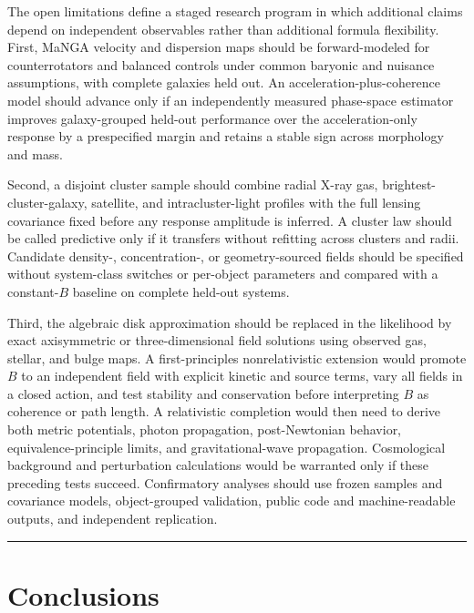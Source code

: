 \documentclass[aps,prd,reprint,superscriptaddress,showpacs,floatfix,longbibliography]{revtex4-2}
\begin{document}
The open limitations define a staged research program in which additional claims depend on independent observables rather than additional formula flexibility. First, MaNGA velocity and dispersion maps should be forward-modeled for counterrotators and balanced controls under common baryonic and nuisance assumptions, with complete galaxies held out. An acceleration-plus-coherence model should advance only if an independently measured phase-space estimator improves galaxy-grouped held-out performance over the acceleration-only response by a prespecified margin and retains a stable sign across morphology and mass.

Second, a disjoint cluster sample should combine radial X-ray gas, brightest-cluster-galaxy, satellite, and intracluster-light profiles with the full lensing covariance fixed before any response amplitude is inferred. A cluster law should be called predictive only if it transfers without refitting across clusters and radii. Candidate density-, concentration-, or geometry-sourced fields should be specified without system-class switches or per-object parameters and compared with a constant-$B$ baseline on complete held-out systems.

Third, the algebraic disk approximation should be replaced in the likelihood by exact axisymmetric or three-dimensional field solutions using observed gas, stellar, and bulge maps. A first-principles nonrelativistic extension would promote $B$ to an independent field with explicit kinetic and source terms, vary all fields in a closed action, and test stability and conservation before interpreting $B$ as coherence or path length. A relativistic completion would then need to derive both metric potentials, photon propagation, post-Newtonian behavior, equivalence-principle limits, and gravitational-wave propagation. Cosmological background and perturbation calculations would be warranted only if these preceding tests succeed. Confirmatory analyses should use frozen samples and covariance models, object-grouped validation, public code and machine-readable outputs, and independent replication.

\medskip\hrule\medskip

\section{Conclusions}
\end{document}
